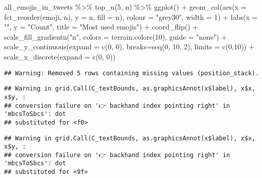 \documentclass[
]{article}
\newenvironment{Shaded}{\begin{snugshade}}{\end{snugshade}}
\newcommand{\AttributeTok}[1]{\textcolor[rgb]{0.77,0.63,0.00}{#1}}
\newcommand{\DecValTok}[1]{\textcolor[rgb]{0.00,0.00,0.81}{#1}}
\newcommand{\FunctionTok}[1]{\textcolor[rgb]{0.00,0.00,0.00}{#1}}
\newcommand{\NormalTok}[1]{#1}
\newcommand{\SpecialCharTok}[1]{\textcolor[rgb]{0.00,0.00,0.00}{#1}}
\newcommand{\StringTok}[1]{\textcolor[rgb]{0.31,0.60,0.02}{#1}}
\begin{document}
\begin{Shaded}
\begin{Highlighting}[]
\NormalTok{all\_emojis\_in\_tweets }\SpecialCharTok{\%\textgreater{}\%} 
  \FunctionTok{top\_n}\NormalTok{(}\DecValTok{5}\NormalTok{, n) }\SpecialCharTok{\%\textgreater{}\%} 
\FunctionTok{ggplot}\NormalTok{() }\SpecialCharTok{+}
  \FunctionTok{geom\_col}\NormalTok{(}\FunctionTok{aes}\NormalTok{(}\AttributeTok{x =} \FunctionTok{fct\_reorder}\NormalTok{(emoji, n), }\AttributeTok{y =}\NormalTok{ n, }\AttributeTok{fill =}\NormalTok{ n), }
           \AttributeTok{colour =} \StringTok{"grey30"}\NormalTok{, }\AttributeTok{width =} \DecValTok{1}\NormalTok{) }\SpecialCharTok{+}
  \FunctionTok{labs}\NormalTok{(}\AttributeTok{x =} \StringTok{""}\NormalTok{, }\AttributeTok{y =} \StringTok{"Count"}\NormalTok{, }\AttributeTok{title =} \StringTok{"Most used emojis"}\NormalTok{) }\SpecialCharTok{+}
  \FunctionTok{coord\_flip}\NormalTok{() }\SpecialCharTok{+}
   \FunctionTok{scale\_fill\_gradientn}\NormalTok{(}\StringTok{"n"}\NormalTok{, }\AttributeTok{colors =} \FunctionTok{terrain.colors}\NormalTok{(}\DecValTok{10}\NormalTok{), }\AttributeTok{guide =} \StringTok{"none"}\NormalTok{) }\SpecialCharTok{+}
  \FunctionTok{scale\_y\_continuous}\NormalTok{(}\AttributeTok{expand =} \FunctionTok{c}\NormalTok{(}\DecValTok{0}\NormalTok{, }\DecValTok{0}\NormalTok{),}
                     \AttributeTok{breaks=}\FunctionTok{seq}\NormalTok{(}\DecValTok{0}\NormalTok{, }\DecValTok{10}\NormalTok{, }\DecValTok{2}\NormalTok{), }\AttributeTok{limits =} \FunctionTok{c}\NormalTok{(}\DecValTok{0}\NormalTok{,}\DecValTok{10}\NormalTok{)) }\SpecialCharTok{+}
  \FunctionTok{scale\_x\_discrete}\NormalTok{(}\AttributeTok{expand =} \FunctionTok{c}\NormalTok{(}\DecValTok{0}\NormalTok{, }\DecValTok{0}\NormalTok{)) }
\end{Highlighting}
\end{Shaded}

\begin{verbatim}
## Warning: Removed 5 rows containing missing values (position_stack).
\end{verbatim}

\begin{verbatim}
## Warning in grid.Call(C_textBounds, as.graphicsAnnot(x$label), x$x, x$y, :
## conversion failure on '👉 backhand index pointing right' in 'mbcsToSbcs': dot
## substituted for <f0>
\end{verbatim}

\begin{verbatim}
## Warning in grid.Call(C_textBounds, as.graphicsAnnot(x$label), x$x, x$y, :
## conversion failure on '👉 backhand index pointing right' in 'mbcsToSbcs': dot
## substituted for <9f>
\end{verbatim}
\end{document}
